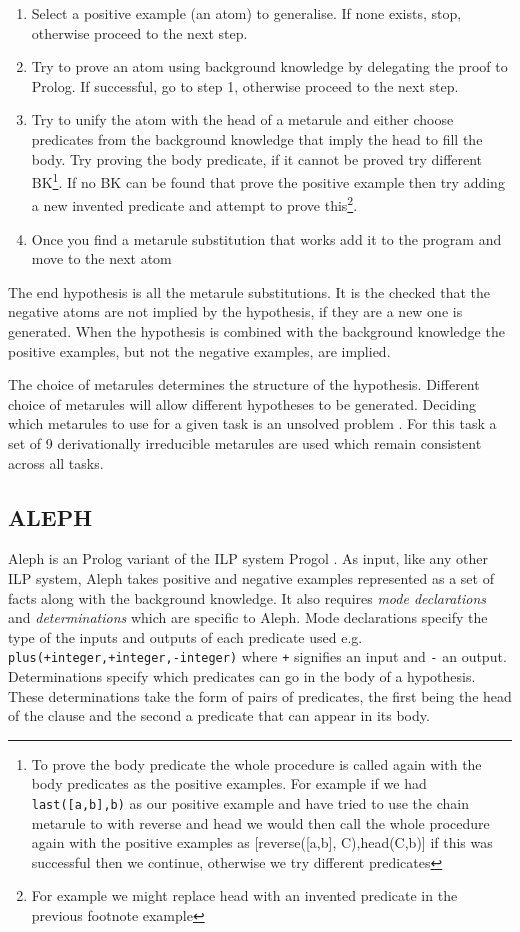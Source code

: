 \cite{Andrew/ILP-review}\cite{Rolf/Metagol}\cite{Metagol/Github}
\begin{enumerate}
\item Select a positive example (an atom) to generalise. If none exists, stop, otherwise proceed to the next step.
\item Try to prove an atom using background knowledge by delegating the proof to Prolog. If successful, go to step 1, otherwise proceed to the next step.
\item Try to unify the atom with the head of a metarule and either choose predicates from the background knowledge that imply the head to fill the body. Try proving the body predicate, if it cannot be proved try different BK\footnote{To prove the body predicate the whole procedure is called again with the body predicates as the positive examples. For example if we had \texttt{last([a,b],b)} as our positive example and have tried to use the chain metarule to with reverse and head we would then call the whole procedure again with the positive examples as [reverse([a,b], C),head(C,b)] if this was successful then we continue, otherwise we try different predicates}. If no BK can be found that prove the positive example then try adding a new invented predicate and attempt to prove this\footnote{For example we might replace head with an invented predicate in the previous footnote example}.
\item Once you find a metarule substitution that works add it to the program and move to the next atom
\end{enumerate}


The end hypothesis is all the metarule substitutions. It is the checked that the negative atoms are not implied by the hypothesis, if they are a new one is generated. When the hypothesis is combined with the background knowledge the positive examples, but not the negative examples, are implied.

The choice of metarules determines the structure of the hypothesis. Different choice of metarules will allow different hypotheses to be generated. Deciding which metarules to use for a given task is an unsolved problem \cite{Cropper/Thesis}. For this task a set of 9 derivationally irreducible metarules are used which remain consistent across all tasks.
\subsection{ALEPH}
Aleph is an Prolog variant of the ILP system Progol \cite{Muggleton/Aleph}. As input, like any other ILP system, Aleph takes positive and negative examples represented as a set of facts along with the background knowledge. It also requires \textit{mode declarations} and \textit{determinations} which are specific to Aleph. Mode declarations specify the type of the inputs and outputs of each predicate used e.g. \texttt{plus(+integer,+integer,-integer)} where \texttt{+} signifies an input and \texttt{-} an output.
Determinations specify which predicates can go in the body of a hypothesis. These determinations take the form of pairs of predicates, the first being the head of the clause and the second a predicate that can appear in its body.

